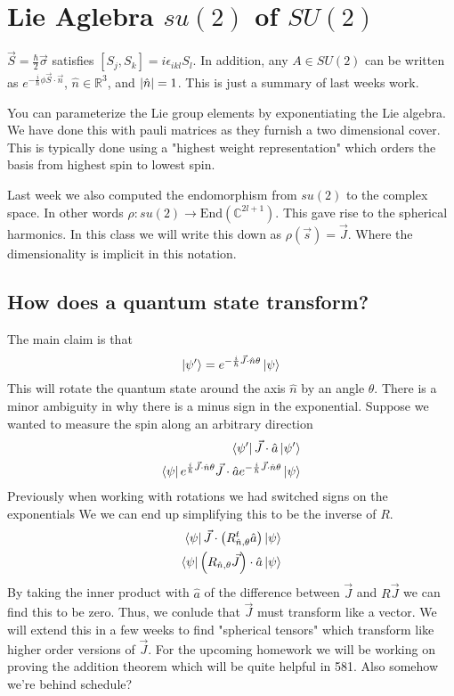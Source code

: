 \section{Lie Aglebra $su(2)$ of $SU(2)$}
$\vec{S} = \frac{\hbar}{2} \vec{\sigma}$ satisfies 
$\left[S_j, S_k\right] = i \epsilon_{ikl} S_l$. In addition,
any $A \in SU(2)$ can be written as
$e^{-\frac{i}{\hbar}\phi \vec{S} \cdot \vec{n}}$,
$\hat{n}\in \mathbb{R}^3$, and $\abs*{\hat{n}} = 1$.
This is just a summary of last weeks work.

You can parameterize the Lie group elements by exponentiating
the Lie algebra. We have done this with pauli matrices as
they furnish a two dimensional cover. This is typically done
using a "highest weight representation" which orders the basis
from highest spin to lowest spin.

Last week we also computed the endomorphism from $su(2)$ to the complex
space. In other words $\rho: su(2) \rightarrow \text{End}(\mathbb{C}^{2l+1})$.
This gave rise to the spherical harmonics. In this class we will write this
down as $\rho(\vec{s}) = \vec{J}$. Where the dimensionality is implicit
in this notation.

\subsection{How does a quantum state transform?}
The main claim is that
$$
    \Ket{\psi'} = e^{-\frac{i}{\hbar} \vec{J}\cdot \hat{n} \theta}
    \Ket{\psi}
$$
This will rotate the quantum state around the axis $\hat{n}$ by an
angle $\theta$. There is a minor ambiguity in why there is a minus
sign in the exponential. Suppose we wanted to measure the spin along
an arbitrary direction
\begin{align*}
    \Bra{\psi'} \vec{J}\cdot \hat{a} \Ket{\psi'} \\
    \Bra{\psi} e^{\frac{i}{\hbar} \vec{J} \cdot \hat{n} \theta}
        \vec{J} \cdot \hat{a}
        e^{-\frac{i}{\hbar} \vec{J} \cdot \hat{n} \theta} 
        \Ket{\psi}
\end{align*}
Previously when working with rotations we had switched signs on the exponentials
We we can end up simplifying this to be the inverse of $R$.
\begin{align*}
    \Bra{\psi} \vec{J} \cdot \left(R^t_{\hat{n}, \theta} \hat{a}\right) \Ket{\psi} \\
    \Bra{\psi} \left(R_{\hat{n}, \theta} \vec{J}\right) \cdot \hat{a} \Ket{\psi}
\end{align*}
By taking the inner product with $\hat{a}$ of the difference between $\vec{J}$ and
$R \vec{J}$ we can find this to be zero.
Thus, we conlude that $\vec{J}$ must transform like a vector. We will extend this in
a few weeks to find "spherical tensors" which transform like higher order versions of
$\vec{J}$. For the upcoming homework we will be working on proving the addition theorem
which will be quite helpful in 581. Also somehow we're behind schedule?

